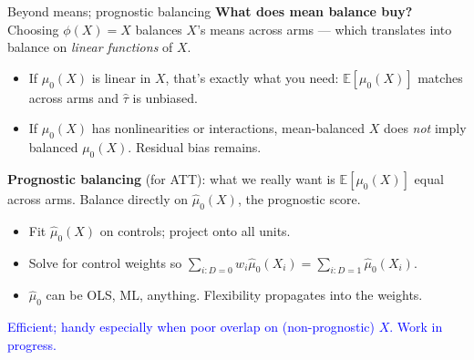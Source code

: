 \documentclass[xcolor=dvipsnames]{beamer}
\newcommand\E{\mathbb{E}}
\begin{document}
\begin{frame}{Beyond means; prognostic balancing}
\small
{} \textbf{What does mean balance buy?} Choosing $\phi(X) = X$ balances $X$'s means across arms --- which translates into balance on \textit{linear functions} of $X$.
\begin{itemize}\itemsep1pt
\item If $\mu_0(X)$ is linear in $X$, that's exactly what you need: $\E[\mu_0(X)]$ matches across arms and $\widehat\tau$ is unbiased.
\item If $\mu_0(X)$ has nonlinearities or interactions, mean-balanced $X$ does \emph{not} imply balanced $\mu_0(X)$. Residual bias remains.
\end{itemize}

\medskip
{} \textbf{Prognostic balancing} (for ATT): what we really want is $\E[\mu_0(X)]$ equal across arms. Balance directly on $\widehat\mu_0(X)$, the prognostic score.
\begin{itemize}\itemsep1pt
\item Fit $\widehat\mu_0(X)$ on controls; project onto all units.
\item Solve for control weights so $\sum_{i:D=0} w_i \widehat\mu_0(X_i) = \sum_{i:D=1} \widehat\mu_0(X_i)$.
\item $\widehat\mu_0$ can be OLS, ML, anything. Flexibility propagates into the weights.
\end{itemize}

\medskip
{} \textcolor{Blue}{Efficient; handy especially when poor overlap on (non-prognostic) $X$. Work in progress.}
\end{frame}


\end{document}
